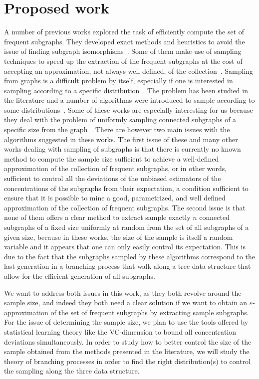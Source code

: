 \section{Proposed work}\label{sec:graphimineproposal}
A number of previous works explored the task of efficiently compute the set of
frequent subgraphs. They developed exact methods and heuristics to avoid the
issue of finding subgraph
isomorphisms~\citep{BaskervilleP06,GrochowK07,OmidiSMN09}. Some of them make use
of sampling techniques to speed up the extraction of the frequent subgraphs at
the cost of accepting an approximation, not always well defined, of the
collection~\cite{KashtanIMA04}. Sampling from graphs is a difficult problem by
itself, especially if one is interested in sampling according to a specific
distribution~\citep{LeskovecF06,ZouH10}. The problem has been studied in the
literature and a number of algorithms were introduced to sample according to some
distributions~\citep{LeeXE12}. Some of these works are especially interesting
for us because they deal with the problem of uniformly sampling connected
subgraphs of a specific size from the graph~\citep{Wernicke06,RibeiroS10,LuB12}.
There are however two main issues with the algorithms suggested in these works.
The first issue of these and many other works dealing with sampling of subgraphs
is that there is currently no known method to compute the sample size sufficient
to achieve a well-defined approximation of the collection of frequent subgraphs,
or in other words, sufficient to control all the deviations of the unbiased
estimators of the concentrations of the subgraphs from their expectation, a
condition sufficient to ensure that it is possible to mine a good, parametrized,
and well defined approximation of the collection of frequent subgraphs.  The
second issue is that none of them offers a clear method to extract sample
exactly $n$ connected subgraphs of a fixed size uniformly at random from the set
of all subgraphs of a given size, because in these works, the size of the sample
is itself a random variable and it appears that one can only easily control its
expectation. This is due to the fact that the subgraphs sampled by these
algorithms correspond to the last generation in a branching process that walk
along a tree data structure that allow for the efficient generation of all
subgraphs. 

We want to address both issues in this work, as they both revolve around the
sample size, and indeed they both need a clear solution if we want to obtain an
$\varepsilon$-approximation of the set of frequent subgraphs by extracting
sample subgraphs. For the issue of determining the sample size, we plan to use
the tools offered by statistical learning theory like the VC-dimension to bound
all concentration deviations simultaneously. In order to study how to better
control the size of the sample obtained from the methods presented in the
literature, we will study the theory of branching processes in order to find the
right distribution(s) to control the sampling along the three data structure.

